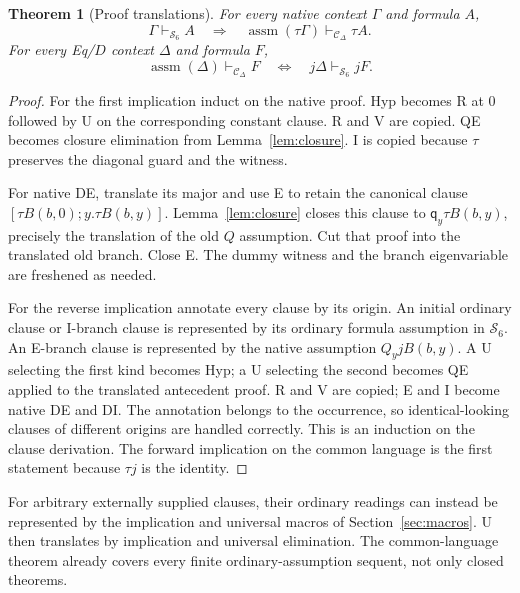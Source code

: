 \documentclass[11pt]{article}
\newtheorem{theorem}{Theorem}[section]
\theoremstyle{definition}\newtheorem{definition}[theorem]{Definition}
\theoremstyle{remark}\newtheorem{remark}[theorem]{Remark}
\newcommand{\Cd}{\ensuremath{\mathcal C_{\Delta}}}
\newcommand{\Ssix}{\ensuremath{\mathcal S_6}}
\newcommand{\assm}{\operatorname{assm}}
\newcommand{\qq}{\mathsf q}
\begin{document}
\begin{theorem}[Proof translations]\label{thm:prooftranslation}
For every native context $\Gamma$ and formula $A$,
\[
 \Gamma\vdash_{\Ssix}A
 \quad\Longrightarrow\quad
 \assm(\tau\Gamma)\vdash_{\Cd}\tau A.
\]
For every Eq/$D$ context $\Delta$ and formula $F$,
\[
 \assm(\Delta)\vdash_{\Cd}F
 \quad\Longleftrightarrow\quad
 j\Delta\vdash_{\Ssix}jF.
\]
\end{theorem}
\begin{proof}
For the first implication induct on the native proof. Hyp becomes R at $0$ followed by U on the corresponding constant clause. R and V are copied. QE becomes closure elimination from Lemma~\ref{lem:closure}. I is copied because $\tau$ preserves the diagonal guard and the witness.

For native DE, translate its major and use E to retain the canonical clause
$[\tau B(b,0);y.\tau B(b,y)]$. Lemma~\ref{lem:closure} closes this clause to $\qq_y\tau B(b,y)$, precisely the translation of the old $Q$ assumption. Cut that proof into the translated old branch. Close E. The dummy witness and the branch eigenvariable are freshened as needed.

For the reverse implication annotate every clause by its origin. An initial ordinary clause or I-branch clause is represented by its ordinary formula assumption in \Ssix. An E-branch clause is represented by the native assumption $Q_yjB(b,y)$. A U selecting the first kind becomes Hyp; a U selecting the second becomes QE applied to the translated antecedent proof. R and V are copied; E and I become native DE and DI. The annotation belongs to the occurrence, so identical-looking clauses of different origins are handled correctly. This is an induction on the clause derivation. The forward implication on the common language is the first statement because $\tau j$ is the identity.
\end{proof}

For arbitrary externally supplied clauses, their ordinary readings can instead be represented by the implication and universal macros of Section~\ref{sec:macros}. U then translates by implication and universal elimination. The common-language theorem already covers every finite ordinary-assumption sequent, not only closed theorems.
\end{document}
